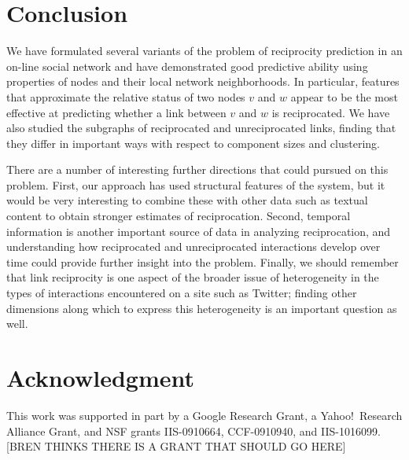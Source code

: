 \documentclass[conference]{IEEEtran}
\begin{document}
\section{Conclusion}

We have formulated several variants of the problem of 
reciprocity prediction in an on-line social network and have
demonstrated good predictive ability
using properties of nodes and their local network neighborhoods.
In particular, features that approximate the relative status of
two nodes $v$ and $w$ appear to be the most effective at 
predicting whether a link between $v$ and $w$ is reciprocated.
We have also studied the subgraphs of reciprocated and unreciprocated
links, finding that they differ in important ways with respect
to component sizes and clustering.

There are a number of interesting further directions that could
pursued on this problem.
First, our approach has used structural features of the system,
but it would be very interesting to combine these with other
data such as textual content to obtain
stronger estimates of reciprocation.
Second, temporal information is another important source of data
in analyzing reciprocation, and understanding how reciprocated
and unreciprocated interactions develop over time could provide
further insight into the problem.
Finally, we should remember that link reciprocity is one aspect of
the broader issue of heterogeneity in the types of interactions
encountered on a site such as Twitter; finding other
dimensions along which to express this heterogeneity is an 
important question as well.


 \section*{Acknowledgment}
This work was supported in part by a Google Research Grant, a Yahoo!~Research Alliance Grant, and NSF grants IIS-0910664, CCF-0910940, and IIS-1016099.  [BREN THINKS THERE IS A GRANT THAT SHOULD GO HERE]




\end{document}
